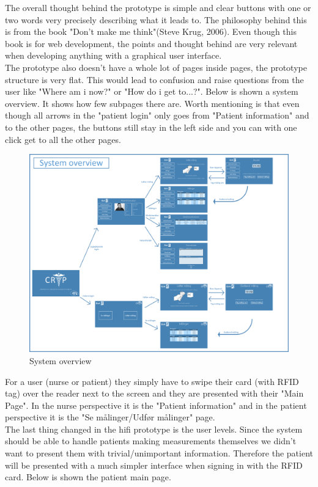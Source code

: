 The overall thought behind the prototype is simple and clear buttons with one or two words very precisely describing what it leads to. The philosophy behind this is from the book "Don't make me think"(Steve Krug, 2006). Even though this book is for web development, the points and thought behind are very relevant when developing anything with a graphical user interface.\\
The prototype also doesn't have a whole lot of pages inside pages, the prototype structure is very flat. This would lead to confusion and raise questions from the user like "Where am i now?" or "How do i get to...?". Below is shown a system overview. It shows how few subpages there are. Worth mentioning is that even though all arrows in the "patient login" only goes from "Patient information" and to the other pages, the buttons still stay in the left side and you can with one click get to all the other pages.\\
\begin{figure}[H]
\centering
\includegraphics[width=1\textwidth]{billeder/system_hifi.png}
\caption{System overview}
\end{figure}
For a user (nurse or patient) they simply have to swipe their card (with RFID tag) over the reader next to the screen and they are presented with their "Main Page". In the nurse perspective it is the "Patient information" and in the patient perspective it is the "Se målinger/Udfør målinger" page.\\
The last thing changed in the hifi prototype is the user levels. Since the system should be able to handle patients making measurements themselves we didn't want to present them with trivial/unimportant information. Therefore the patient will be presented with a much simpler interface when signing in with the RFID card. Below is shown the patient main page.\\
